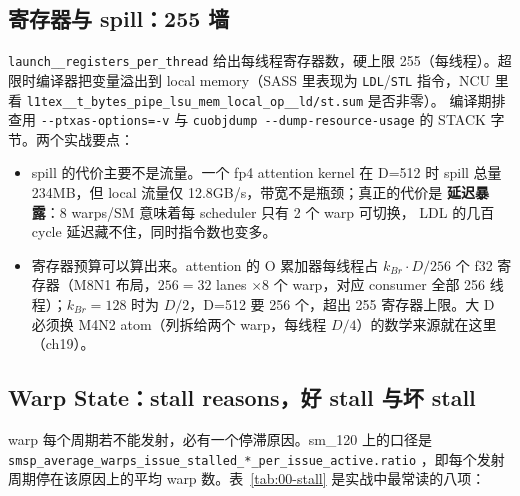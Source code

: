 \subsection{寄存器与 spill：255 墙}

\texttt{launch\_\allowbreak{}\_\allowbreak{}registers\_\allowbreak{}per\_\allowbreak{}thread} 给出每线程寄存器数，硬上限
255（每线程）。超限时编译器把变量溢出到 local memory（SASS 里表现为
\texttt{LDL}/\texttt{STL} 指令，NCU 里看
\texttt{l1tex\_\allowbreak{}\_\allowbreak{}t\_\allowbreak{}bytes\_\allowbreak{}pipe\_\allowbreak{}lsu\_\allowbreak{}mem\_\allowbreak{}\allowbreak{}local\_\allowbreak{}op\_\allowbreak{}\_\allowbreak{}ld/\allowbreak{}st.sum} 是否非零）。
编译期排查用 \texttt{-{}-ptxas-options=\allowbreak{}-v} 与
\texttt{cuobjdump -{}-dump-resource-usage} 的 STACK 字节。两个实战要点：

\begin{itemize}
\item spill 的代价主要不是流量。一个 fp4 attention kernel 在 D=512 时
  spill 总量 234MB，但 local 流量仅 12.8GB/s，带宽不是瓶颈；真正的代价是
  \textbf{延迟暴露}：8 warps/SM 意味着每 scheduler 只有 2 个 warp 可切换，
  LDL 的几百 cycle 延迟藏不住，同时指令数也变多。
\item 寄存器预算可以算出来。attention 的 O 累加器每线程占
  $k_{Br}\cdot D/256$ 个 f32 寄存器（M8N1 布局，$256=32$ lanes $\times 8$
  个 warp，对应 consumer 全部 256 线程）；$k_{Br}{=}128$ 时为
  $D/2$，D=512 要 256 个，超出 255 寄存器上限。大 D 必须换
  M4N2 atom（列拆给两个 warp，每线程 $D/4$）的数学来源就在这里（ch19）。
\end{itemize}

\subsection{Warp State：stall reasons，好 stall 与坏 stall}

warp 每个周期若不能发射，必有一个停滞原因。sm\_120 上的口径是
\texttt{smsp\_\allowbreak{}average\_\allowbreak{}warps\_\allowbreak{}issue\_\allowbreak{}stalled\_\allowbreak{}*\_\allowbreak{}per\_\allowbreak{}issue\_\allowbreak{}active.\allowbreak{}ratio}
，即每个发射周期停在该原因上的平均 warp 数。表~\ref{tab:00-stall}
是实战中最常读的八项：

